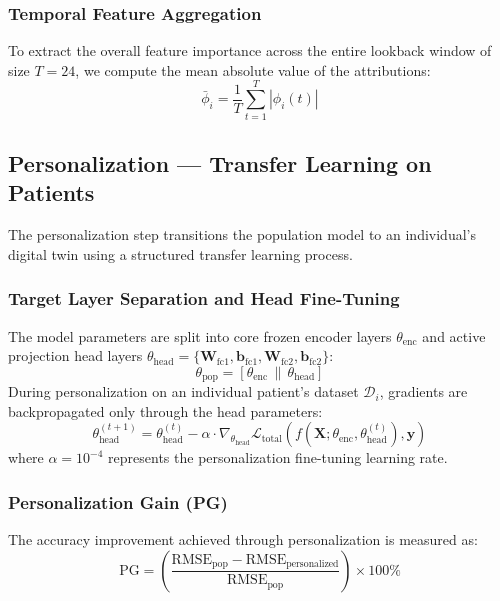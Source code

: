 \documentclass[10pt,journal,compsoc,twocolumn]{IEEEtran}
\begin{document}
\subsubsection{Temporal Feature Aggregation}
To extract the overall feature importance across the entire lookback window of size $T = 24$, we compute the mean absolute value of the attributions:
\begin{equation}
\bar{\phi}_i = \frac{1}{T} \sum_{t=1}^T \left| \phi_{i}(t) \right|
\end{equation}

\subsection{Personalization — Transfer Learning on Patients}
The personalization step transitions the population model to an individual's digital twin using a structured transfer learning process.

\subsubsection{Target Layer Separation and Head Fine-Tuning}
The model parameters are split into core frozen encoder layers $\theta_{\text{enc}}$ and active projection head layers $\theta_{\text{head}} = \{\mathbf{W}_{\text{fc1}}, \mathbf{b}_{\text{fc1}}, \mathbf{W}_{\text{fc2}}, \mathbf{b}_{\text{fc2}}\}$:
\begin{equation}
\theta_{\text{pop}} = \left[ \theta_{\text{enc}} \,\|\, \theta_{\text{head}} \right]
\end{equation}
During personalization on an individual patient's dataset $\mathcal{D}_i$, gradients are backpropagated only through the head parameters:
\begin{equation}
\theta_{\text{head}}^{(t+1)} = \theta_{\text{head}}^{(t)} - \alpha \cdot \nabla_{\theta_{\text{head}}} \mathcal{L}_{\text{total}}\left(f\left(\mathbf{X}; \theta_{\text{enc}}, \theta_{\text{head}}^{(t)}\right), \mathbf{y}\right)
\end{equation}
where $\alpha = 10^{-4}$ represents the personalization fine-tuning learning rate.

\subsubsection{Personalization Gain (PG)}
The accuracy improvement achieved through personalization is measured as:
\begin{equation}
\text{PG} = \left( \frac{\text{RMSE}_{\text{pop}} - \text{RMSE}_{\text{personalized}}}{\text{RMSE}_{\text{pop}}} \right) \times 100\%
\end{equation}
\end{document}
